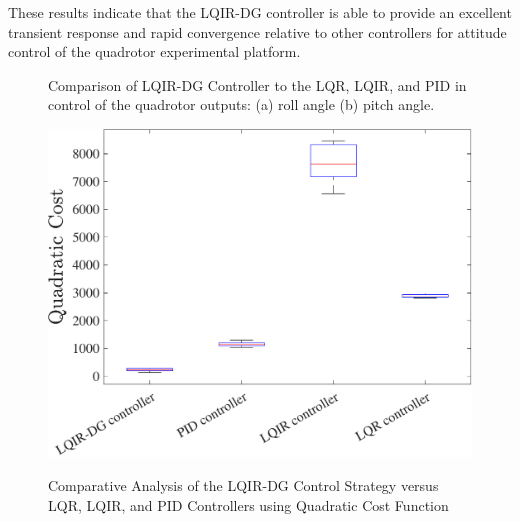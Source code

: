 \documentclass[3p,times]{elsarticle}
\begin{document}
These results indicate that the LQIR-DG controller is able to provide an excellent transient response and rapid convergence relative to other controllers for attitude control of the quadrotor experimental platform.



\begin{figure}[H]
	\centering
	\caption{Comparison of LQIR-DG Controller to the LQR, LQIR, and PID in control of the quadrotor outputs: (a) roll angle (b) pitch angle.}
	\label{fig:compare}
\end{figure}

\begin{figure}[H]
	\centering
	{\includegraphics[width=.49\linewidth]{../Figure/implementation/box_plot/lqidgvsboxplot}
	}
	\caption{Comparative Analysis of the LQIR-DG Control Strategy versus LQR, LQIR, and PID Controllers using Quadratic Cost Function}
	\label{fig:compare_boxplot}
\end{figure}
\end{document}
